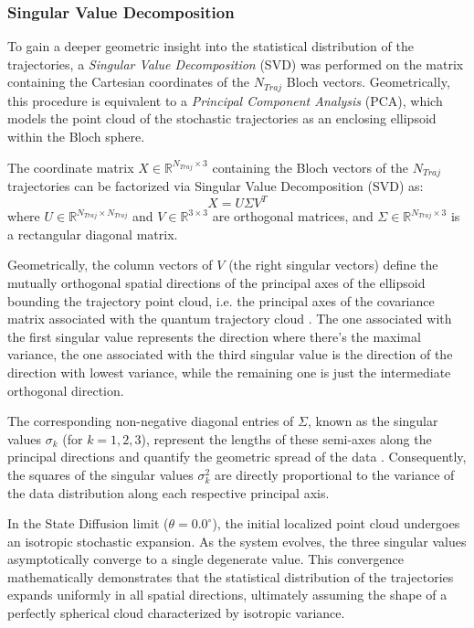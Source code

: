 \documentclass[a4paper,12pt]{article}
\begin{document}
\subsubsection{Singular Value Decomposition}
\label{subsub:SVD_Analysis}
To gain a deeper geometric insight into the statistical distribution of the trajectories, a \textit{Singular Value Decomposition} (SVD) was performed on the matrix containing the Cartesian coordinates of the $N_{Traj}$ Bloch vectors. Geometrically, this procedure is equivalent to a \textit{Principal Component Analysis} (PCA), which models the point cloud of the stochastic trajectories as an enclosing ellipsoid within the Bloch sphere.

The coordinate matrix $X \in \mathbb{R}^{N_{Traj} \times 3}$ containing the Bloch vectors of the $N_{Traj}$ trajectories can be factorized via Singular Value Decomposition (SVD) as:
\begin{equation}
	X = U \Sigma V^T
\end{equation}
where $U \in \mathbb{R}^{N_{Traj} \times N_{Traj}}$ and $V \in \mathbb{R}^{3 \times 3}$ are orthogonal matrices, and $\Sigma \in \mathbb{R}^{N_{Traj} \times 3}$ is a rectangular diagonal matrix. 

Geometrically, the column vectors of $V$ (the right singular vectors) define the mutually orthogonal spatial directions of the principal axes of the ellipsoid bounding the trajectory point cloud, i.e. the principal axes of the covariance matrix associated with the quantum trajectory cloud . The one associated with the first singular value represents the direction where there's the maximal variance, the one associated with the third singular value is the direction of the direction with lowest variance, while the remaining one is just the intermediate orthogonal direction.

The corresponding non-negative diagonal entries of $\Sigma$, known as the singular values $\sigma_k$ (for $k = 1, 2, 3$), represent the lengths of these semi-axes along the principal directions and quantify the geometric spread of the data . Consequently, the squares of the singular values $\sigma_k^2$ are directly proportional to the variance of the data distribution along each respective principal axis.

In the State Diffusion limit ($\theta = 0.0^\circ$), the initial localized point cloud undergoes an isotropic stochastic expansion. As the system evolves, the three singular values asymptotically converge to a single degenerate value. This convergence mathematically demonstrates that the statistical distribution of the trajectories expands uniformly in all spatial directions, ultimately assuming the shape of a perfectly spherical cloud characterized by isotropic variance.
\end{document}
